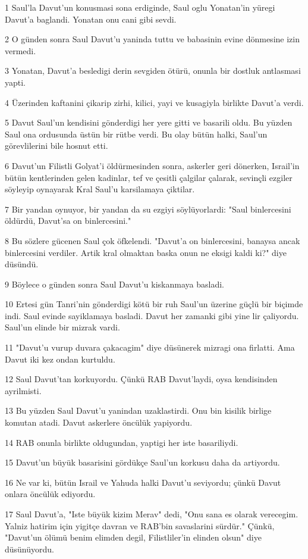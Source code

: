 \par 1 Saul'la Davut'un konusmasi sona erdiginde, Saul oglu Yonatan'in yüregi Davut'a baglandi. Yonatan onu cani gibi sevdi.
\par 2 O günden sonra Saul Davut'u yaninda tuttu ve babasinin evine dönmesine izin vermedi.
\par 3 Yonatan, Davut'a besledigi derin sevgiden ötürü, onunla bir dostluk antlasmasi yapti.
\par 4 Üzerinden kaftanini çikarip zirhi, kilici, yayi ve kusagiyla birlikte Davut'a verdi.
\par 5 Davut Saul'un kendisini gönderdigi her yere gitti ve basarili oldu. Bu yüzden Saul ona ordusunda üstün bir rütbe verdi. Bu olay bütün halki, Saul'un görevlilerini bile hosnut etti.
\par 6 Davut'un Filistli Golyat'i öldürmesinden sonra, askerler geri dönerken, Israil'in bütün kentlerinden gelen kadinlar, tef ve çesitli çalgilar çalarak, sevinçli ezgiler söyleyip oynayarak Kral Saul'u karsilamaya çiktilar.
\par 7 Bir yandan oynuyor, bir yandan da su ezgiyi söylüyorlardi: "Saul binlercesini öldürdü, Davut'sa on binlercesini."
\par 8 Bu sözlere gücenen Saul çok öfkelendi. "Davut'a on binlercesini, banaysa ancak binlercesini verdiler. Artik kral olmaktan baska onun ne eksigi kaldi ki?" diye düsündü.
\par 9 Böylece o günden sonra Saul Davut'u kiskanmaya basladi.
\par 10 Ertesi gün Tanri'nin gönderdigi kötü bir ruh Saul'un üzerine güçlü bir biçimde indi. Saul evinde sayiklamaya basladi. Davut her zamanki gibi yine lir çaliyordu. Saul'un elinde bir mizrak vardi.
\par 11 "Davut'u vurup duvara çakacagim" diye düsünerek mizragi ona firlatti. Ama Davut iki kez ondan kurtuldu.
\par 12 Saul Davut'tan korkuyordu. Çünkü RAB Davut'laydi, oysa kendisinden ayrilmisti.
\par 13 Bu yüzden Saul Davut'u yanindan uzaklastirdi. Onu bin kisilik birlige komutan atadi. Davut askerlere öncülük yapiyordu.
\par 14 RAB onunla birlikte oldugundan, yaptigi her iste basariliydi.
\par 15 Davut'un büyük basarisini gördükçe Saul'un korkusu daha da artiyordu.
\par 16 Ne var ki, bütün Israil ve Yahuda halki Davut'u seviyordu; çünkü Davut onlara öncülük ediyordu.
\par 17 Saul Davut'a, "Iste büyük kizim Merav" dedi, "Onu sana es olarak verecegim. Yalniz hatirim için yigitçe davran ve RAB'bin savaslarini sürdür." Çünkü, "Davut'un ölümü benim elimden degil, Filistliler'in elinden olsun" diye düsünüyordu.
